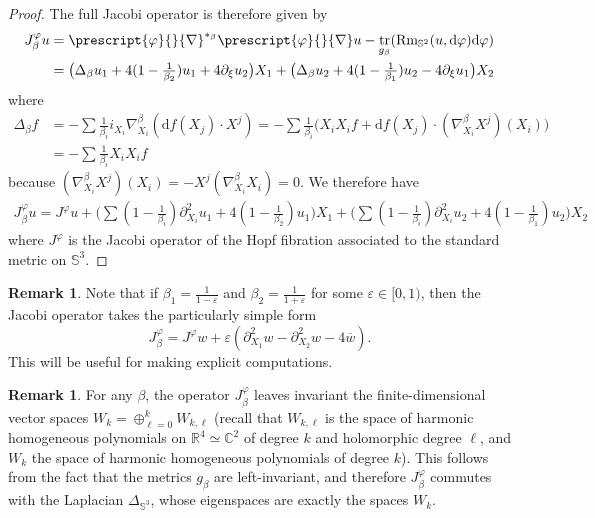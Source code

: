 \documentclass{article}
\numberwithin{equation}{section}        %
\theoremstyle{bfnote}
\theoremstyle{definition}
\theoremstyle{bfremark}
\newtheorem{rem}[thm]{Remark}               %
\newcommand{\R}{\mathbb{R}}                 %
\newcommand{\C}{\mathbb{C}}                 %
\newcommand{\Sp}{\mathbb{S}}                %
\newcommand{\diff}{\mathrm{d}}                      %
\DeclareMathOperator{\tr}{tr}                   %
\begin{document}
\begin{proof}
    The full Jacobi operator is therefore given by 
    \begin{align*}
        J^{\varphi}_\beta u &= \prescript{\varphi}{}{\nabla}^{*_\beta}\prescript{\varphi}{}{\nabla} u - \tr_{g_\beta}(\mathrm{Rm}_{\Sp^2}(u,\diff\varphi)\diff\varphi) \\
        &= \big(\Delta_\beta u_1 + 4(1-\tfrac{1}{\beta_2}) u_1 + 4 \partial_\xi u_2\big) X_1 + \big( \Delta_\beta u_2 + 4(1- \tfrac{1}{\beta_1}) u_2 - 4 \partial_\xi u_1\big) X_2
    \end{align*}
    where 
    \begin{align*}
        \Delta_\beta f &= -\sum \tfrac{1}{\beta_i} i_{X_i} \nabla^{\beta}_{X_i} (\diff f(X_j) \cdot X^j) = - \sum \tfrac{1}{\beta_i} \big(X_iX_i f + \diff f (X_j) \cdot (\nabla^{\beta}_{X_i} X^j) (X_i)\big) \\
        &= - \sum \tfrac{1}{\beta_i} X_iX_i f
    \end{align*}
    because $(\nabla^{\beta}_{X_i} X^j) (X_i) = -X^j (\nabla^{\beta}_{X_i} X_i) = 0.$ We therefore have 
    \begin{align*} 
        J^{\varphi}_\beta u = J^{\varphi} u + \big(\textstyle{\sum} (1-\tfrac{1}{\beta_i}) \partial^2_{X_i} u_1 + 4 (1-\tfrac{1}{\beta_2})u_1\big) X_1 + \big(\textstyle{\sum} (1-\tfrac{1}{\beta_i}) \partial^2_{X_i} u_2 + 4 (1-\tfrac{1}{\beta_1})u_2\big) X_2  
    \end{align*} 
    where $J^\varphi$ is the Jacobi operator of the Hopf fibration associated to the standard metric on $\Sp^3$.
\end{proof}

\begin{rem}     \label{rem: Explicit Jacobi operator}
    Note that if $\beta_1 = \frac{1}{1-\varepsilon}$ and $\beta_2 = \frac{1}{1+\varepsilon}$ for some $\varepsilon \in [0,1)$, then the Jacobi operator takes the particularly simple form
    \begin{equation*}
        J^\varphi_\beta = J^\varphi w + \varepsilon(\partial_{X_1}^2w -\partial_{X_2}^2w - 4 \overline{w}).
    \end{equation*}
    This will be useful for making explicit computations.
\end{rem}

\begin{rem}     \label{rem: pertrubed Jacobi operator preserves Wk}
    For any $\beta$, the operator $J^\varphi_\beta$ leaves invariant the finite-dimensional vector spaces $W_k = \oplus_{\ell=0}^k W_{k,\ell}$ (recall that $W_{k,\ell}$ is the space of harmonic homogeneous polynomials on $\R^4 \simeq \C^2$ of degree $k$ and holomorphic degree $\ell$, and $W_k$ the space of harmonic homogeneous polynomials of degree $k$). This follows from the fact that the metrics $g_\beta$ are left-invariant, and therefore $J^\varphi_\beta$ commutes with the Laplacian $\Delta_{\mathbb{S}^3}$, whose eigenspaces are exactly the spaces $W_k$.
\end{rem}
\end{document}
